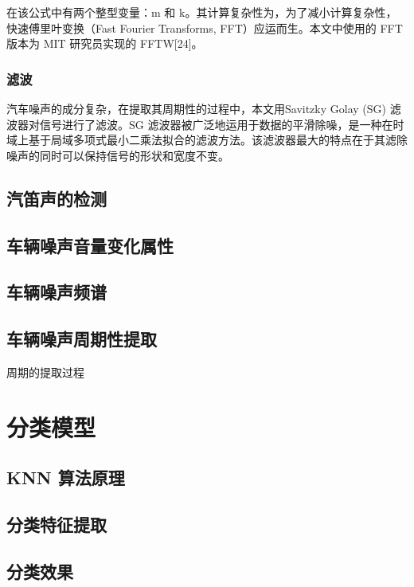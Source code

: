 在该公式中有两个整型变量：m 和 k。其计算复杂性为，为了减小计算复杂性，快速傅里叶变换（Fast Fourier Transforms, FFT）应运而生。本文中使用的 FFT 版本为 MIT 研究员实现的 FFTW[24]。

\subsubsection{滤波}

汽车噪声的成分复杂，在提取其周期性的过程中，本文用Savitzky Golay (SG) 滤波器对信号进行了滤波。SG 滤波器被广泛地运用于数据的平滑除噪，是一种在时域上基于局域多项式最小二乘法拟合的滤波方法。该滤波器最大的特点在于其滤除噪声的同时可以保持信号的形状和宽度不变。

\subsection{汽笛声的检测}

\subsection{车辆噪声音量变化属性}

\subsection{车辆噪声频谱}

\subsection{车辆噪声周期性提取}

周期的提取过程





\section{分类模型}

\subsection{KNN 算法原理}

\subsection{分类特征提取}

\subsection{分类效果}






